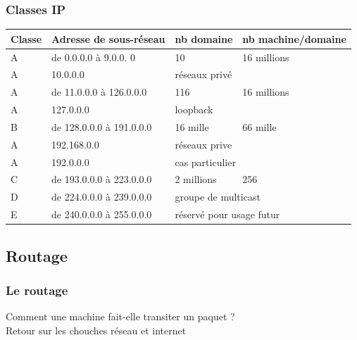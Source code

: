 %
\begin{frame}\frametitle{Classes IP}
    
\begin{table}[h]
\begin{tabular}{l|l|l|l}
Classe & Adresse de sous-réseau   & nb domaine     & nb machine/domaine   \\ \hline
    A  & de 0.0.0.0 à 9.0.0. 0    & 10             & 16 millions           \\ \hline
    A  & 10.0.0.0                 & \multicolumn{2}{l}{réseaux privé}       \\ \hline
    A  & de 11.0.0.0 à 126.0.0.0  & 116            & 16 millions             \\ \hline
    A  & 127.0.0.0                &\multicolumn{2}{l}{loopback}               \\ \hline
    B  & de 128.0.0.0 à 191.0.0.0 & 16 mille       & 66 mille                  \\ \hline
    A  & 192.168.0.0              & \multicolumn{2}{l}{réseaux prive}           \\ \hline
    A  & 192.0.0.0                & \multicolumn{2}{l}{cas particulier}           \\ \hline
    C  & de 193.0.0.0 à 223.0.0.0 & 2 millions     & 256                         \\ \hline
    D  & de 224.0.0.0 à 239.0.0.0 &\multicolumn{2}{l}{groupe de multicast}        \\ \hline
    E  & de 240.0.0.0 à 255.0.0.0 &\multicolumn{2}{l}{réservé pour usage futur}    \\ 
\end{tabular}
\end{table}

\end{frame}

\subsection{Routage}
\begin{frame}\frametitle{Le routage}

    {\Huge Comment une machine fait-elle transiter un paquet ?}\\
    Retour sur les chouches réseau et internet\\
    

\end{frame}


